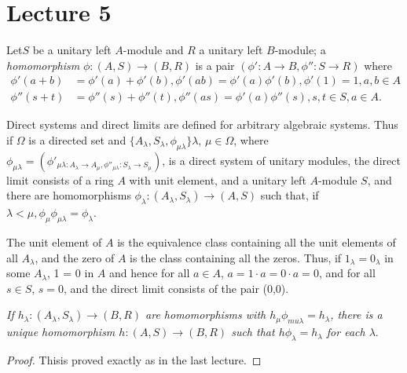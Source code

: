 \chapter{Lecture 5}%

\begin{defi*}%
Let\pageoriginale $S$ be a unitary left $A$-module and $R$ a unitary
left $B$-module; 
a \textit{homomorphism} $\phi : (A,S) \rightarrow (B,R)$ is a pair
$(\phi' : A \rightarrow B, \phi'' : S \rightarrow R)$ where 
\begin{align*}
\phi' (a+b) & = \phi' (a) + \phi' (b), \phi' (ab) = \phi' (a) \phi'
(b), \phi' (1) = 1, a, b \in A\\ 
\phi'' (s+t) & = \phi'' (s) + \phi'' (t), \phi'' (as) = \phi' (a) \phi''
(s), s, t \in S, a \in A. 
\end{align*}
\end{defi*}


Direct systems and direct limits are defined for arbitrary algebraic
systems. Thus if $\Omega$ is a directed set and $\{A_\lambda,
S_\lambda, \phi_{\mu\lambda} \} \lambda$, $\mu \in \Omega$, where
$\phi_{\mu\lambda} = (\phi'_{\mu\lambda : A_\lambda \rightarrow A_\mu,
  \phi''_{\mu\lambda} : S_\lambda \rightarrow S_\mu})$, is a direct
system of unitary modules, the direct limit consists of a ring $A$
with unit element, and a unitary left $A$-module $S$, and there are
homomorphisms $\phi_\lambda : (A_\lambda, S_\lambda) \rightarrow
(A,S)$ such that, if $\lambda < \mu, \phi_{\mu}\phi_{\mu\lambda} =
\phi_\lambda$. 

The unit element of $A$ is the equivalence class containing all the
unit elements of all $A_\lambda$, and the zero of $A$ is the class
containing all the zeros. Thus, if $1_\lambda = 0_\lambda$ in some
$A_\lambda$, 1 = 0 in $A$ and hence for all $a \in A$, $a =1 \cdot a =
0 \cdot a=0$, and for all $s \in S$, $s = 0$, and the direct limit
consists of the 
pair (0,0). 

\textit{If $h_\lambda : (A_\lambda, S_\lambda) \rightarrow (B,R)$ are
  homomorphisms with $h_\mu \phi_{mu\lambda} = h_\lambda$, there is a
  unique homomorphism $h : (A, S) \rightarrow (B,R)$ such that $h
  \phi_\lambda = h_\lambda$ for each $\lambda$}. 

\begin{proof}%
This\pageoriginale is proved exactly as in the last lecture.
\end{proof}

